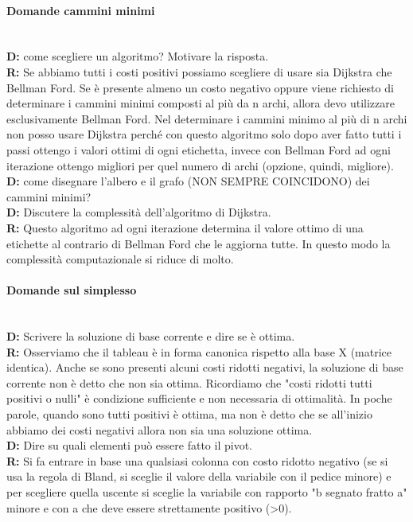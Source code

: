 \documentclass[10pt,                    %
               a4paper,                 %
               twoside,                 %
               openright,               %
               english,                 
               italian,                 
]{article}
\begin{document}
\paragraph{Domande cammini minimi} \mbox{} \\
\textbf{D:} come scegliere un algoritmo? Motivare la risposta. \\
\textbf{R:} Se abbiamo tutti i costi positivi possiamo scegliere di usare sia Dijkstra che Bellman Ford. Se è presente almeno un costo negativo oppure viene richiesto di determinare i cammini minimi composti al più da n archi, allora devo utilizzare esclusivamente Bellman Ford. Nel determinare i cammini minimo al più di n archi non posso usare Dijkstra perché con questo algoritmo solo dopo aver fatto tutti i passi ottengo i valori ottimi di ogni etichetta, invece con Bellman Ford ad ogni iterazione ottengo migliori per quel numero di archi (opzione, quindi, migliore). \\

\textbf{D:} come disegnare l'albero e il grafo (NON SEMPRE COINCIDONO) dei cammini minimi?
\\

\textbf{D:} Discutere la complessità dell'algoritmo di Dijkstra. \\
\textbf{R:} Questo algoritmo ad ogni iterazione determina il valore ottimo di una etichette al contrario di Bellman Ford che le aggiorna tutte. In questo modo la complessità computazionale si riduce di molto.  

\paragraph{Domande sul simplesso} \mbox{} \\
\textbf{D:} Scrivere la soluzione di base corrente e dire se è ottima. \\
\textbf{R:} Osserviamo che il tableau è in forma canonica rispetto alla base X (matrice identica). Anche se sono presenti alcuni costi ridotti negativi, la soluzione di base corrente non è detto che non sia ottima. Ricordiamo che "costi ridotti tutti positivi o nulli" è condizione sufficiente e non necessaria di ottimalità. In poche parole, quando sono tutti positivi è ottima, ma non è detto che se all'inizio abbiamo dei costi negativi allora non sia una soluzione ottima. \\

\textbf{D:} Dire su quali elementi può essere fatto il pivot. \\
\textbf{R:} Si fa entrare in base una qualsiasi colonna con costo ridotto negativo (se si usa la regola di Bland, si sceglie il valore della variabile con il pedice minore) e per scegliere quella uscente si sceglie la variabile con rapporto "b segnato fratto a" minore e con a che deve essere strettamente positivo (>0). \\
\end{document}
